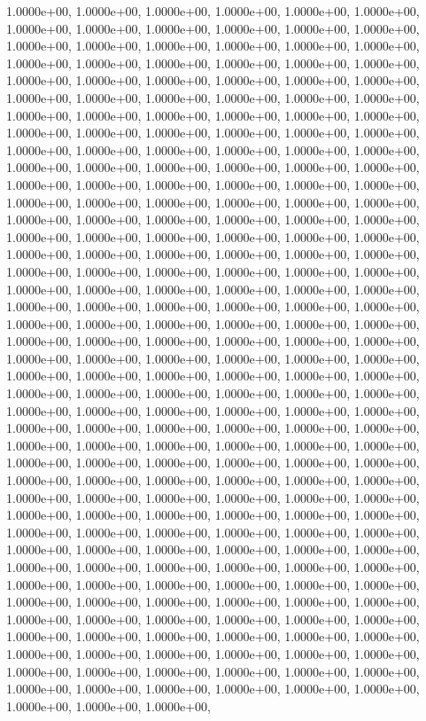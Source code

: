 \documentclass[letterpaper,10pt,english]{sphinxmanual}
\begin{document}
\begin{fulllineitems}
       1.0000e+00, 1.0000e+00, 1.0000e+00, 1.0000e+00, 1.0000e+00,         1.0000e+00, 1.0000e+00, 1.0000e+00, 1.0000e+00, 1.0000e+00,         1.0000e+00, 1.0000e+00, 1.0000e+00, 1.0000e+00, 1.0000e+00,         1.0000e+00, 1.0000e+00, 1.0000e+00, 1.0000e+00, 1.0000e+00,         1.0000e+00, 1.0000e+00, 1.0000e+00, 1.0000e+00, 1.0000e+00,         1.0000e+00, 1.0000e+00, 1.0000e+00, 1.0000e+00, 1.0000e+00,         1.0000e+00, 1.0000e+00, 1.0000e+00, 1.0000e+00, 1.0000e+00,         1.0000e+00, 1.0000e+00, 1.0000e+00, 1.0000e+00, 1.0000e+00,         1.0000e+00, 1.0000e+00, 1.0000e+00, 1.0000e+00, 1.0000e+00,         1.0000e+00, 1.0000e+00, 1.0000e+00, 1.0000e+00, 1.0000e+00,         1.0000e+00, 1.0000e+00, 1.0000e+00, 1.0000e+00, 1.0000e+00,         1.0000e+00, 1.0000e+00, 1.0000e+00, 1.0000e+00, 1.0000e+00,         1.0000e+00, 1.0000e+00, 1.0000e+00, 1.0000e+00, 1.0000e+00,         1.0000e+00, 1.0000e+00, 1.0000e+00, 1.0000e+00, 1.0000e+00,         1.0000e+00, 1.0000e+00, 1.0000e+00, 1.0000e+00, 1.0000e+00,         1.0000e+00, 1.0000e+00, 1.0000e+00, 1.0000e+00, 1.0000e+00,         1.0000e+00, 1.0000e+00, 1.0000e+00, 1.0000e+00, 1.0000e+00,         1.0000e+00, 1.0000e+00, 1.0000e+00, 1.0000e+00, 1.0000e+00,         1.0000e+00, 1.0000e+00, 1.0000e+00, 1.0000e+00, 1.0000e+00,         1.0000e+00, 1.0000e+00, 1.0000e+00, 1.0000e+00, 1.0000e+00,         1.0000e+00, 1.0000e+00, 1.0000e+00, 1.0000e+00, 1.0000e+00,         1.0000e+00, 1.0000e+00, 1.0000e+00, 1.0000e+00, 1.0000e+00,         1.0000e+00, 1.0000e+00, 1.0000e+00, 1.0000e+00, 1.0000e+00,         1.0000e+00, 1.0000e+00, 1.0000e+00, 1.0000e+00, 1.0000e+00,         1.0000e+00, 1.0000e+00, 1.0000e+00, 1.0000e+00, 1.0000e+00,         1.0000e+00, 1.0000e+00, 1.0000e+00, 1.0000e+00, 1.0000e+00,         1.0000e+00, 1.0000e+00, 1.0000e+00, 1.0000e+00, 1.0000e+00,         1.0000e+00, 1.0000e+00, 1.0000e+00, 1.0000e+00, 1.0000e+00,         1.0000e+00, 1.0000e+00, 1.0000e+00, 1.0000e+00, 1.0000e+00,         1.0000e+00, 1.0000e+00, 1.0000e+00, 1.0000e+00, 1.0000e+00,         1.0000e+00, 1.0000e+00, 1.0000e+00, 1.0000e+00, 1.0000e+00,         1.0000e+00, 1.0000e+00, 1.0000e+00, 1.0000e+00, 1.0000e+00,         1.0000e+00, 1.0000e+00, 1.0000e+00, 1.0000e+00, 1.0000e+00,         1.0000e+00, 1.0000e+00, 1.0000e+00, 1.0000e+00, 1.0000e+00,         1.0000e+00, 1.0000e+00, 1.0000e+00, 1.0000e+00, 1.0000e+00,         1.0000e+00, 1.0000e+00, 1.0000e+00, 1.0000e+00, 1.0000e+00,         1.0000e+00, 1.0000e+00, 1.0000e+00, 1.0000e+00, 1.0000e+00,         1.0000e+00, 1.0000e+00, 1.0000e+00, 1.0000e+00, 1.0000e+00,         1.0000e+00, 1.0000e+00, 1.0000e+00, 1.0000e+00, 1.0000e+00,         1.0000e+00, 1.0000e+00, 1.0000e+00, 1.0000e+00, 1.0000e+00,         1.0000e+00, 1.0000e+00, 1.0000e+00, 1.0000e+00, 1.0000e+00,         1.0000e+00, 1.0000e+00, 1.0000e+00, 1.0000e+00, 1.0000e+00,         1.0000e+00, 1.0000e+00, 1.0000e+00, 1.0000e+00, 1.0000e+00,         1.0000e+00, 1.0000e+00, 1.0000e+00, 1.0000e+00, 1.0000e+00,         1.0000e+00, 1.0000e+00, 1.0000e+00, 1.0000e+00, 1.0000e+00,         1.0000e+00, 1.0000e+00, 1.0000e+00, 1.0000e+00, 1.0000e+00,         1.0000e+00, 1.0000e+00, 1.0000e+00, 1.0000e+00, 1.0000e+00,         1.0000e+00, 1.0000e+00, 1.0000e+00, 1.0000e+00, 1.0000e+00,         1.0000e+00, 1.0000e+00, 1.0000e+00, 
\end{fulllineitems}
\end{document}
